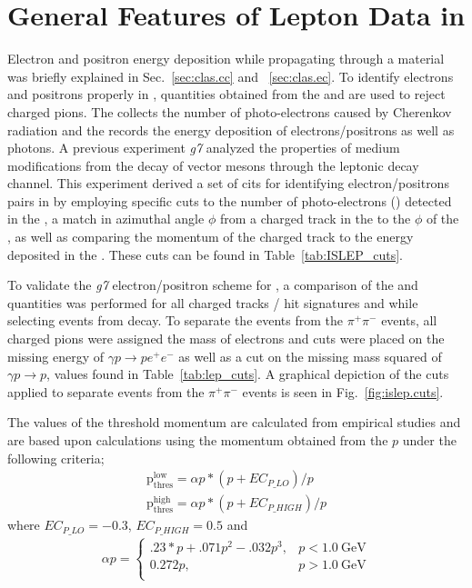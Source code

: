 \section{General Features of Lepton Data in }\label{sec:analysis.Lepton.general}

Electron and positron energy deposition while propagating through a material was briefly explained in Sec.~\ref{sec:clas.cc} and ~\ref{sec:clas.ec}. To identify electrons and positrons properly in , quantities obtained from the  and  are used to reject charged pions. The  collects the number of photo-electrons caused by Cherenkov radiation and the  records the energy deposition of electrons/positrons as well as photons. A previous  experiment \emph{g7} analyzed the properties of medium modifications from the decay of vector mesons through the leptonic decay channel. This experiment derived a set of cits for identifying electron/positrons pairs in  by employing specific cuts to the number of photo-electrons () detected in the , a match in azimuthal angle $\phi$ from a charged track in the  to the $\phi$ of the , as well as comparing the momentum of the charged track to the energy deposited in the . These cuts can be found in Table~\ref{tab:ISLEP_cuts}.  

To validate the \emph{g7} electron/positron  scheme for , a comparison of  the  and  quantities was performed for all charged tracks / hit signatures and while selecting events from \piz decay. To separate the \piz events from the $\pi^{+}\pi^{-}$ events, all charged pions were assigned the mass of electrons and cuts were placed on the missing energy of $\gamma p \rightarrow p e^+ e^-$ as well as a cut on the missing mass squared of $\gamma p \rightarrow p$, values found in Table~\ref{tab:lep_cuts}. A graphical depiction of the cuts applied to separate \piz events from the $\pi^{+}\pi^{-}$ events is seen in Fig.~\ref{fig:islep.cuts}.
 
The values of the threshold momentum are calculated from empirical studies and are based upon calculations using the momentum obtained from the $p$ under the following criteria;
\begin{align}
\mathrm{p_{thres}^{low}} = \alpha p *(p+EC_{P\_LO})/p \nonumber \\
\mathrm{p_{thres}^{high}} = \alpha p *(p+EC_{P\_HIGH})/p \nonumber
\end{align}
where $EC_{P\_LO} = -0.3$, $EC_{P\_HIGH} = 0.5$ and  
\begin{align}
\alpha p =
\begin{cases}
.23*p + .071p^2 - .032p^3, & p<1.0 \mathrm{~GeV} \\
0.272p, & p>1.0 \mathrm{~GeV} \\
\end{cases}\nonumber
\end{align}


